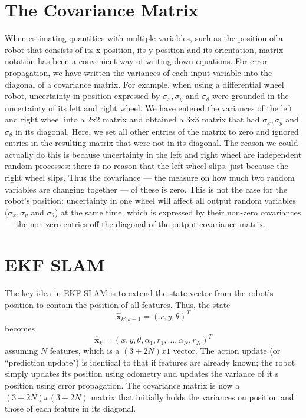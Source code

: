 \documentclass[paper=6.14in:9.21in,pagesize=pdftex,11pt,twoside,openright]{scrbook}
\begin{document}
\section{The Covariance Matrix}
When estimating quantities with multiple variables, such as the position of a robot that consists of its x-position, its y-position and its orientation, matrix notation has been a convenient way of writing down equations. For error propagation, we have written the variances of each input variable into the diagonal of a covariance matrix. For example, when using a differential wheel robot, uncertainty in position expressed by $ \sigma_x, \sigma_y$ and $ \sigma_{\theta}$ were grounded in the uncertainty of its left and right wheel. We have entered the variances of the left and right wheel into a 2x2 matrix and obtained a 3x3 matrix that had $ \sigma_x, \sigma_y$ and $ \sigma_{\theta}$ in its diagonal. Here, we set all other entries of the matrix to zero and ignored entries in the resulting matrix that were not in its diagonal. The reason we could actually do this is because uncertainty in the left and right wheel are independent random processes: there is no reason that the left wheel slips, just because the right wheel slips.  Thus the covariance --- the measure on how much two random variables are changing together --- of these is zero. This is not the case for the robot's position: uncertainty in one wheel will affect all output random variables ($ \sigma_x, \sigma_y$ and $ \sigma_{\theta}$) at the same time, which is expressed by their non-zero covariances --- the non-zero entries off the diagonal of the output covariance matrix.

\section{EKF SLAM}\label{sec:ekfslam}\label{sec:ekf}
The key idea in EKF SLAM is to extend the state vector from the robot's position to contain the position of all features. Thus, the state
\begin{equation}
\hat{\boldsymbol{x}}_{k'|k-1}=(x,y,\theta)^T
\end{equation}
becomes
\begin{equation}
\hat{\boldsymbol{x}}_{k}=(x,y,\theta,\alpha_1,r_1,\ldots,\alpha_N,r_N)^T
\end{equation}
assuming $ N$ features, which is a $(3+2N) x1$ vector. The action update (or ``prediction update") is identical to that if features are already known; the robot simply updates its position using odometry and updates the variance of it s position using error propagation. The covariance matrix is now a $(3+2N)x(3+2N)$ matrix that initially holds the variances on position and those of each feature in its diagonal.
\end{document}

